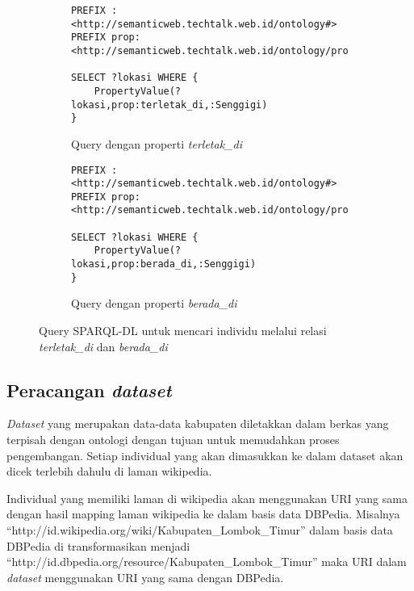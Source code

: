 \begin{figure}[hb]
	\centering
	\begin{subfigure}{1\linewidth}
		\begin{lstlisting}
PREFIX : <http://semanticweb.techtalk.web.id/ontology#>
PREFIX prop:<http://semanticweb.techtalk.web.id/ontology/property#>

SELECT ?lokasi WHERE {
	PropertyValue(?lokasi,prop:terletak_di,:Senggigi)
}\end{lstlisting}
		\caption{Query dengan properti \emph{terletak\_di}}
		\label{fig:a}
	\end{subfigure}

	\begin{subfigure}{1\linewidth}
	\begin{lstlisting}	
PREFIX : <http://semanticweb.techtalk.web.id/ontology#>
PREFIX prop:<http://semanticweb.techtalk.web.id/ontology/property#>

SELECT ?lokasi WHERE {
	PropertyValue(?lokasi,prop:berada_di,:Senggigi)
}\end{lstlisting}
	\caption{Query dengan properti \emph{berada\_di}}
	\label{fig:b}
	\end{subfigure}
	\caption{Query SPARQL-DL untuk mencari individu melalui relasi \emph{terletak\_di} dan \emph{berada\_di}}
	\label{fig:sparqldl_query}
\end{figure}

\subsection{Peracangan \emph{dataset}}
\emph{Dataset} yang merupakan data-data kabupaten diletakkan dalam berkas yang terpisah dengan ontologi dengan tujuan untuk memudahkan proses pengembangan. Setiap individual yang akan dimasukkan ke dalam dataset akan dicek terlebih dahulu di laman wikipedia. 

Individual yang memiliki laman di wikipedia akan menggunakan URI yang sama dengan hasil mapping laman wikipedia ke dalam basis data DBPedia. Misalnya ``http://id.wikipedia.org/wiki/Kabupaten\_Lombok\_Timur'' dalam basis data DBPedia di transformasikan menjadi ``http://id.dbpedia.org/resource/Kabupaten\_Lombok\_Timur'' maka URI dalam \emph{dataset} menggunakan URI yang sama dengan DBPedia.




